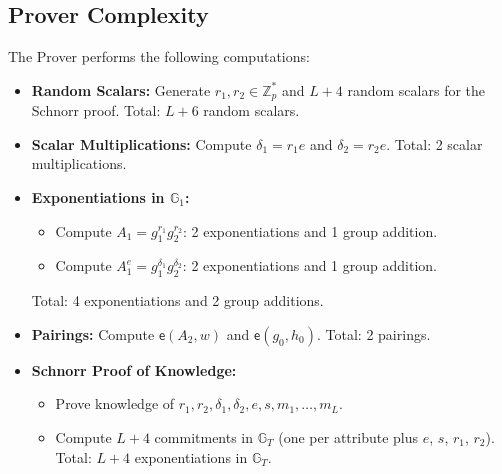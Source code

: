 {\subsection{Prover Complexity}
The Prover performs the following computations:
\begin{itemize}
    \item \textbf{Random Scalars:} Generate $r_1, r_2 \in \mathbb{Z}_p^*$ and $L+4$ random scalars for the Schnorr proof. Total: $L+6$ random scalars.
    \item \textbf{Scalar Multiplications:} Compute $\delta_1 = r_1 e$ and $\delta_2 = r_2 e$. Total: 2 scalar multiplications.
    \item \textbf{Exponentiations in $\mathbb{G}_1$:}
    \begin{itemize}
        \item Compute $A_1 = g_1^{r_1} g_2^{r_2}$: 2 exponentiations and 1 group addition.
        \item Compute $A_1^e = g_1^{\delta_1} g_2^{\delta_2}$: 2 exponentiations and 1 group addition.
    \end{itemize}
    Total: 4 exponentiations and 2 group additions.
    \item \textbf{Pairings:} Compute $\mathsf{e}(A_2, w)$ and $\mathsf{e}(g_0, h_0)$. Total: 2 pairings.
    \item \textbf{Schnorr Proof of Knowledge:}
    \begin{itemize}
        \item Prove knowledge of $r_1, r_2, \delta_1, \delta_2, e, s, m_1, \ldots, m_L$. 
        \item Compute $L+4$ commitments in $\mathbb{G}_T$ (one per attribute plus $e$, $s$, $r_1$, $r_2$). Total: $L+4$ exponentiations in $\mathbb{G}_T$.
    \end{itemize}
\end{itemize}

}
